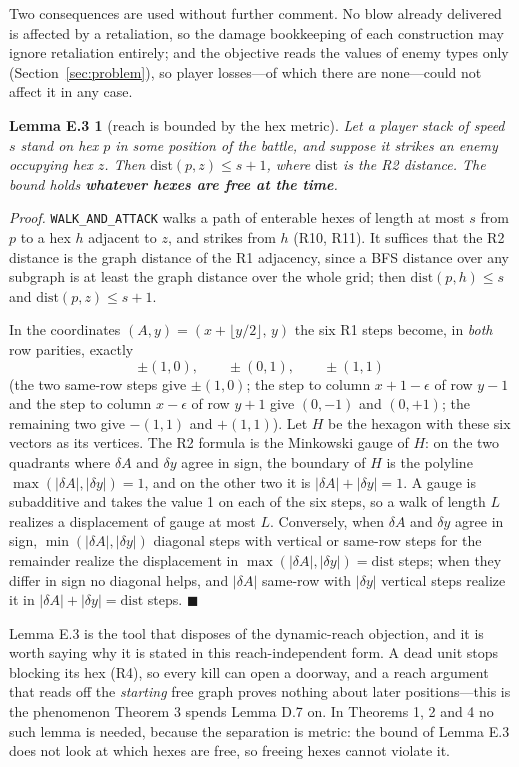 \documentclass[11pt,a4paper]{article}
\theoremstyle{plain}
\newtheorem*{lemEmetric}{Lemma E.3}
\theoremstyle{definition}
\theoremstyle{plain}
\theoremstyle{definition}
\theoremstyle{remark}
\newcommand{\qedbox}{\hfill$\blacksquare$}
\begin{document}
\smallskip
Two consequences are used without further comment. No blow already delivered is affected by
a retaliation, so the damage bookkeeping of each construction may ignore retaliation
entirely; and the objective reads the values of enemy types only
(Section~\ref{sec:problem}), so player losses---of which there are none---could not affect
it in any case.

\begin{lemEmetric}[reach is bounded by the hex metric]
Let a player stack of speed $s$ stand on hex $p$ in some position of the battle, and suppose
it strikes an enemy occupying hex $z$. Then $\mathrm{dist}(p,z)\le s+1$, where
$\mathrm{dist}$ is the R2 distance. The bound holds \textbf{whatever hexes are free at the
time}.
\end{lemEmetric}

\noindent\emph{Proof.} \texttt{WALK\_AND\_ATTACK} walks a path of enterable hexes of length
at most $s$ from $p$ to a hex $h$ adjacent to $z$, and strikes from $h$ (R10, R11). It
suffices that the R2 distance is the graph distance of the R1 adjacency, since a BFS
distance over any subgraph is at least the graph distance over the whole grid; then
$\mathrm{dist}(p,h)\le s$ and $\mathrm{dist}(p,z)\le s+1$.

In the coordinates $(A,y)=(x+\lfloor y/2\rfloor,\,y)$ the six R1 steps become, in \emph{both}
row parities, exactly
\[
  \pm(1,0),\qquad \pm(0,1),\qquad \pm(1,1)
\]
(the two same-row steps give $\pm(1,0)$; the step to column $x+1-\epsilon$ of row $y-1$ and
the step to column $x-\epsilon$ of row $y+1$ give $(0,-1)$ and $(0,+1)$; the remaining two
give $-(1,1)$ and $+(1,1)$). Let $H$ be the hexagon with these six vectors as its vertices.
The R2 formula is the Minkowski gauge of $H$: on the two quadrants where $\delta A$ and
$\delta y$ agree in sign, the boundary of $H$ is the polyline
$\max(|\delta A|,|\delta y|)=1$, and on the other two it is $|\delta A|+|\delta y|=1$. A
gauge is subadditive and takes the value 1 on each of the six steps, so a walk of length
$L$ realizes a displacement of gauge at most $L$. Conversely, when $\delta A$ and $\delta y$
agree in sign, $\min(|\delta A|,|\delta y|)$ diagonal steps with vertical or same-row steps
for the remainder realize the displacement in $\max(|\delta A|,|\delta y|)=\mathrm{dist}$
steps; when they differ in sign no diagonal helps, and $|\delta A|$ same-row with
$|\delta y|$ vertical steps realize it in $|\delta A|+|\delta y|=\mathrm{dist}$ steps.
\qedbox

\smallskip
Lemma E.3 is the tool that disposes of the dynamic-reach objection, and it is worth saying
why it is stated in this reach-independent form. A dead unit stops blocking its hex (R4), so
every kill can open a doorway, and a reach argument that reads off the \emph{starting} free
graph proves nothing about later positions---this is the phenomenon Theorem 3 spends
Lemma D.7 on. In Theorems 1, 2 and 4 no such lemma is needed, because the separation is
metric: the bound of Lemma E.3 does not look at which hexes are free, so freeing hexes
cannot violate it.
\end{document}
